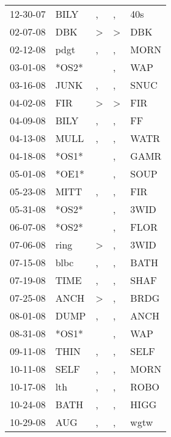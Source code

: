 \begin{supertabular}{lllll}
 12-30-07 &   BILY &                , &                , &    40s \\
 02-07-08 &    DBK &     \textgreater &     \textgreater &    DBK \\
 02-12-08 &   pdgt &                , &                , &   MORN \\
 03-01-08 &  *OS2* &                  &                , &    WAP \\
 03-16-08 &   JUNK &                , &                , &   SNUC \\
 04-02-08 &    FIR &     \textgreater &     \textgreater &    FIR \\
 04-09-08 &   BILY &                , &                , &     FF \\
 04-13-08 &   MULL &                , &                , &   WATR \\
 04-18-08 &  *OS1* &                  &                , &   GAMR \\
 05-01-08 &  *OE1* &                  &                , &   SOUP \\
 05-23-08 &   MITT &                , &                , &    FIR \\
 05-31-08 &  *OS2* &                  &                , &   3WID \\
 06-07-08 &  *OS2* &                  &                , &   FLOR \\
 07-06-08 &   ring &     \textgreater &                , &   3WID \\
 07-15-08 &   blbc &                , &                , &   BATH \\
 07-19-08 &   TIME &                , &                , &   SHAF \\
 07-25-08 &   ANCH &     \textgreater &                , &   BRDG \\
 08-01-08 &   DUMP &                , &                , &   ANCH \\
 08-31-08 &  *OS1* &                  &                , &    WAP \\
 09-11-08 &   THIN &                , &                , &   SELF \\
 10-11-08 &   SELF &                , &                , &   MORN \\
 10-17-08 &    lth &                , &                , &   ROBO \\
 10-24-08 &   BATH &                , &                , &   HIGG \\
 10-29-08 &    AUG &                , &                , &   wgtw \\

\end{supertabular}

